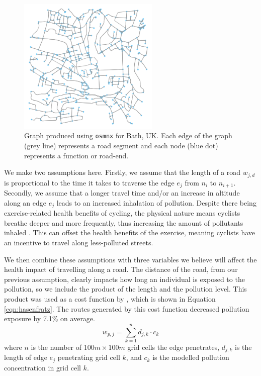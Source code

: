 \documentclass[11pt,twosided,a4paper]{report}
\begin{document}
\begin{figure}[!tb]
\centering
\includegraphics[width=0.6\textwidth]{images/network_graph}
\caption[\texttt{osmnx} graph for Bath.]{Graph produced using \texttt{osmnx} for Bath, UK. Each edge of the graph (grey line) represents a road segment and each node (blue dot) represents a function or road-end.}
\label{fig:network_graph}
\end{figure}

We make two assumptions here. Firstly, we assume that the length of a road $w_{j, d}$ is proportional to the time it takes to traverse the edge $e_j$ from $n_i$ to $n_{i+1}$. Secondly, we assume that a longer travel time and/or an increase in altitude along an edge $e_j$ leads to an increased inhalation of pollution. Despite there being exercise-related health benefits of cycling, the physical nature means cyclists breathe deeper and more frequently, thus increasing the amount of pollutants inhaled \citep{bigazzi2014reviewintake, Ramos2016inhaleddose}. This can offset the health benefits of the exercise, meaning cyclists have an incentive to travel along less-polluted streets.

We then combine these assumptions with three variables we believe will affect the health impact of travelling along a road. The distance of the road, from our previous assumption, clearly impacts how long an individual is exposed to the pollution, so we include the product of the length and the pollution level. This product was used as a cost function by \cite{Hasenfratz2015highresmapsTram}, which is shown in Equation \ref{eqn:hasenfratz}. The routes generated by this cost function decreased pollution exposure by 7.1\% on average.
\begin{equation} \label{eqn:hasenfratz}
w_{p, j} = \sum_{k=1}^{n} d_{j, k} \cdot c_k
\end{equation}
where $n$ is the number of $100m \times 100m$ grid cells the edge penetrates, $d_{j, k}$ is the length of edge $e_j$ penetrating grid cell $k$, and $c_k$ is the modelled pollution concentration in grid cell $k$.
\end{document}
